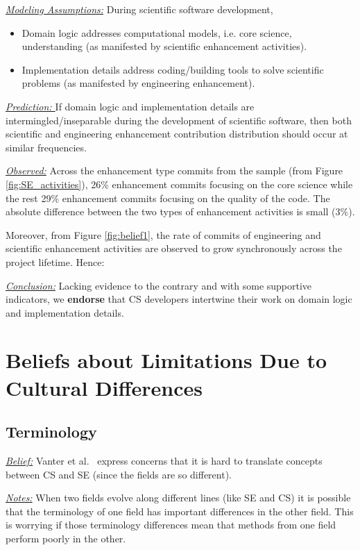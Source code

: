 \documentclass[sigconf,review,anonymous]{acmart}
\newcommand{\bi}{\begin{itemize}}
\newcommand{\ei}{\end{itemize}}
\newenvironment{RQ}{\vspace{1mm}\begin{tcolorbox}[enhanced,width=3.4in,size=fbox,colback=red!5!white,drop shadow southeast,sharp corners]}{\end{tcolorbox}}
\begin{document}
\noindent \textit{\underline{Modeling Assumptions:}} During scientific software development,
\bi
\item Domain logic addresses computational models, i.e. core science, understanding (as manifested by scientific enhancement activities). 
\item Implementation details address coding/building   tools   to solve scientific problems (as manifested by engineering enhancement). 
\ei


\noindent \textit{\underline{Prediction: }} If domain logic and implementation details are intermingled/inseparable during the development of scientific software, then both scientific and engineering enhancement contribution distribution should occur at similar frequencies.

\noindent \textit{\underline{Observed:}} Across the enhancement type commits from the sample (from Figure \ref{fig:SE_activities}), 26\% enhancement commits focusing on the core science while the rest 29\% enhancement commits focusing on the quality of the code. The absolute difference between the two types of enhancement activities is small (3\%). 

Moreover, from Figure \ref{fig:belief1}, the rate of commits of engineering and scientific enhancement activities are observed to grow synchronously across the project lifetime. Hence:

\begin{RQ}
\textit{\underline{Conclusion:}} Lacking evidence to the contrary and with some supportive indicators, 
we \textbf{endorse}  that CS developers intertwine their work
on domain logic and implementation details.
\end{RQ}





\section{Beliefs about Limitations Due to Cultural Differences}

\subsection{Terminology}\label{terms}
\noindent \textit{\underline{Belief:}} 
Vanter et al.~\cite{faulk09_secs, easterbrook_cs, boyle09_lessons} express concerns
that it is hard to translate concepts between  CS and SE (since the fields are so different). 

\noindent \textit{\underline{Notes:}} When two fields evolve along different
lines (like SE and CS) it is possible that the terminology of one field has important
differences in the other field. This is worrying if those terminology differences mean that methods from one field perform poorly in the other.
\end{document}
